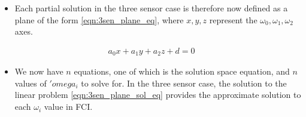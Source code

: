 \documentclass[letterpaper, 10 pt, conference]{ieeeconf}  %
\begin{document}
\begin{itemize}
   \item Each partial solution in the three sensor case is therefore now defined as a plane of the form \eqref{eqn:3sen_plane_eq}, where $x,y,z$ represent the $\omega_0,\omega_1,\omega_2$ axes.
\end{itemize}
\begin{gather}
   a_0x + a_1y +a_2z + d = 0 \label{eqn:3sen_plane_eq}
\end{gather}
\begin{itemize}
   \item We now have $n$ equations, one of which is the solution space equation, and $n$ values of $'omega_i$ to solve for. In the three sensor case, the solution to the linear problem \eqref{eqn:3sen_plane_sol_eq} provides the approximate solution to each $\omega_i$ value in FCI.
\end{itemize}
\end{document}
